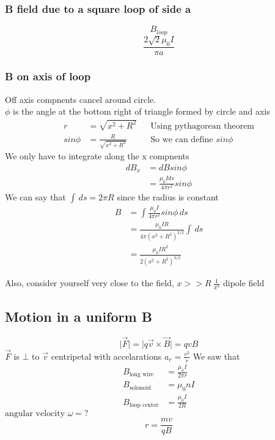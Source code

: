 \documentclass{article}
\begin{document}
    \subsubsection{B field due to a square loop of side a}
    $$B_{loop}$$
    $$\frac{2\sqrt{2}\mu_0 I}{\pi a}$$

    \subsubsection{B on axis of loop}
    Off axis compnents cancel around circle. \\
    $\phi$ is the angle at the bottom right of triangle formed by circle and axis
    \begin{align*}
            r &= \sqrt{x^2 + R^2} && \text{Using pythagorean theorem}\\
            sin\phi &= \frac{R}{\sqrt{x^2 +R^2}} && \text{So we can define }sin\phi
    \end{align*}
    We only have to integrate along the x compnents
    \begin{align*}
            dB_x &=dB sin\phi \\
            &= \frac{\mu_0 I ds}{4\pi r^2}sin\phi
    \end{align*}
    We can say that $\int \,ds = 2\pi R $ since the radius is constant\\
    \begin{align*} 
        B &= \int \frac{\mu_0 I}{4\pi r^2}sin\phi \,ds\\
        &= \frac{\mu_0 I R}{4 \pi (x^2+R^2)^{3/2}}\int \,ds\\
        &= \frac{\mu_0 I R^2}{2 (x^2+R^2)^{3/2}}     
    \end{align*}
    
    Also, consider yourself very close to the field, $ x >> R ~ \frac{1}{x^3}$ dipole field
    \subsection{Motion in a uniform B}
    $$ \lvert \vec{F} \rvert = \lvert q\vec{v} \times \vec{B} \rvert = qvB $$
    $\vec{F}$ is $\bot$ to $\vec{v}$ centripetal with accelarations $a_r = \frac{v^2}{r}$
    We saw that 
    \begin{align*}
        B_{\text{long wire}} &= \frac{\mu_0 I}{2\pi r}\\
        B_{\text{solonoid}} &= \mu_0 n I \\
        B_{\text{loop center}} &= \frac{\mu_0 I}{2R}
    \end{align*}
    $\text{angular velocity } \omega = ?$
    $$r = \frac{mv}{qB}$$
\end{document}
